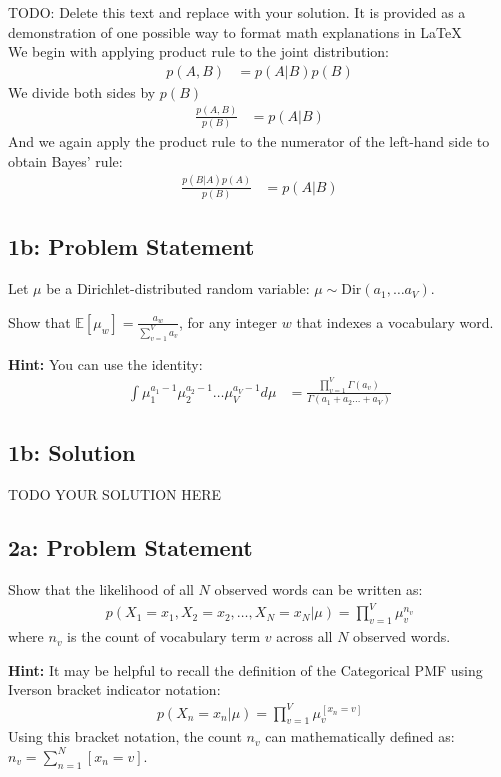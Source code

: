 \documentclass[10pt]{article}
\newcommand{\officialdirections}[1]{{\color{purple} #1}}
\begin{document}
TODO: Delete this text and replace with your solution. It is provided as a demonstration of one possible way to format math explanations in \LaTeX \\
We begin with applying product rule to the joint distribution:
\begin{align*}
    p(A,B) &= p(A|B)p(B)
\end{align*}
We divide both sides by $p(B)$
\begin{align*}
    \frac{p(A,B)}{p(B)} &= p(A|B)
\end{align*}
And we again apply the product rule to the numerator of the left-hand side to obtain Bayes' rule:
\begin{align*}
    \frac{p(B|A)p(A)}{p(B)} &= p(A|B)
\end{align*}

\newpage 

\officialdirections{
\subsection*{1b: Problem Statement}

Let $\mu$ be a Dirichlet-distributed random variable: $\mu \sim \text{Dir}(a_1, \ldots a_V)$. 

Show that $\mathbb{E}[ \mu_w ] = \frac{a_w}{\sum_{v=1}^V a_v}$, for any integer $w$ that indexes a vocabulary word.

\textbf{Hint:} You can use the identity:
\begin{align}
\int \mu_1^{a_1-1} \mu_2^{a_2 - 1} \ldots \mu_V^{a_V-1} d\mu
 &= \frac
 	{\prod_{v=1}^V \Gamma(a_v)}
 	{\Gamma(a_1 + a_2 \ldots + a_V)}
\end{align}
}

\subsection{1b: Solution}
TODO YOUR SOLUTION HERE

\newpage
\officialdirections{
\subsection*{2a: Problem Statement}

Show that the likelihood of all $N$ observed words can be written as:
\begin{align}
p(X_1 = x_1, X_2 = x_2, \ldots, X_N = x_N | \mu) = \prod_{v=1}^V \mu_v^{n_v}
\end{align}
where $n_v$ is the count of vocabulary term $v$ across all $N$ observed words.

\textbf{Hint:}
It may be helpful to recall the definition of the Categorical PMF using Iverson bracket indicator notation:
\begin{align}
p(X_n = x_n | \mu) = \prod_{v=1}^V \mu_v^{[x_n = v]}
\end{align}
Using this bracket notation,  the count $n_v$ can mathematically defined as:  $n_v =  \sum_{n=1}^N [x_n = v]$.
}
\end{document}
